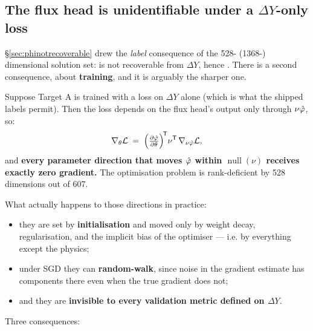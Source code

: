 \subsection{The flux head is unidentifiable under a
            \texorpdfstring{$\Delta Y$}{dY}-only loss}
\label{sec:unidentifiable}

\S\ref{sec:phinotrecoverable} drew the \emph{label} consequence of the 528-
(1368-) dimensional solution set: \Phifl{} is not recoverable from $\Delta Y$,
hence . There is a second consequence, about
\textbf{training}, and it is arguably the sharper one.

Suppose Target A is trained with a loss on $\Delta Y$ alone (which is what the
shipped labels permit). Then the loss depends on the flux head's output only
through $\nu\hat{\varphi}$, so:
%
\begin{equation}
\nabla_{\theta}\mathcal{L} \;=\;
\Bigl(\tfrac{\partial \hat{\varphi}}{\partial\theta}\Bigr)^{\!\mathsf T}
\nu^{\mathsf{T}}\,\nabla_{\nu\hat{\varphi}}\mathcal{L},
\label{eq:gradnull}
\end{equation}
%
and \textbf{every parameter direction that moves $\hat{\varphi}$ within
$\operatorname{null}(\nu)$ receives exactly zero gradient.} The optimisation
problem is rank-deficient by 528 dimensions out of 607.

What actually happens to those directions in practice:

\begin{itemize}
\item they are set by \textbf{initialisation} and moved only by weight decay,
  regularisation, and the implicit bias of the optimiser --- i.e. by everything
  except the physics;
\item under SGD they can \textbf{random-walk}, since noise in the gradient
  estimate has components there even when the true gradient does not;
\item and they are \textbf{invisible to every validation metric defined on
  $\Delta Y$}.
\end{itemize}

Three consequences:

